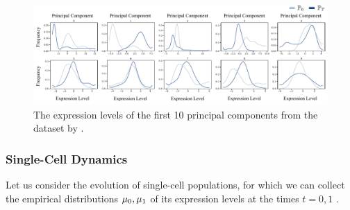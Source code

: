 \begin{figure}
     \centering
         \centering
         \includegraphics[width=\textwidth]{figures/fig_marginals_schiebinger_pcs_cropped.pdf}
         \caption{The expression levels of the first 10 principal components from the dataset by \citet{schiebinger2019optimal}.}
\label{fig:gaussianMain}
\end{figure}

\subsubsection{Single-Cell Dynamics}
\label{sec:gsbflow_cell}


Let us consider the evolution of single-cell populations, for which we can collect the empirical distributions $\mu_0,\mu_1$ of its expression levels at the times $t=0,1$ \citep{schiebinger2019optimal,moon2019visualizing}. 


